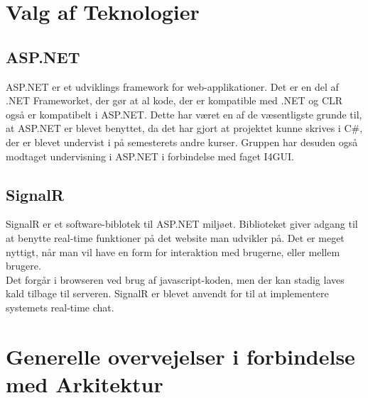 \section{Valg af Teknologier}
\subsection{ASP.NET}
ASP.NET er et udviklings framework for web-applikationer.
Det er en del af .NET Frameworket, der gør at al kode, der er  kompatible med .NET og CLR også er kompatibelt i ASP.NET. Dette har været en af de væsentligste grunde til, at ASP.NET er blevet benyttet, da det har gjort at projektet kunne skrives i C\#, der er blevet undervist i på semesterets andre kurser. Gruppen har desuden også modtaget undervisning i ASP.NET i forbindelse med faget I4GUI.

\subsection{SignalR}
SignalR er et software-biblotek til ASP.NET miljøet. Biblioteket giver adgang til at benytte real-time funktioner på det website man udvikler på. Det er meget nyttigt, når man vil have en form for interaktion med brugerne, eller mellem brugere. \\
Det forgår i browseren ved brug af javascript-koden, men der kan stadig laves kald tilbage til serveren. 
SignalR er blevet anvendt for til at implementere systemets real-time chat.

\section{Generelle overvejelser i forbindelse med Arkitektur}